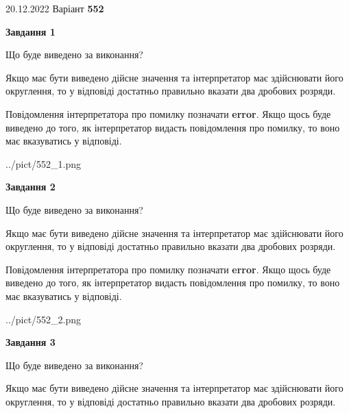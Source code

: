 \documentclass[12pt, ukrainian]{article}
\begin{document}
{20.12.2022 Варіант \No \textbf { 552 }\par}
{
\begin {Large}

{\begin {center}\textbf{Завдання 1}\end {center}}\par
Що буде виведено за виконання? \par

Якщо має бути виведено дійсне значення та інтерпретатор має здійснювати його округлення, 
то у відповіді достатньо правильно вказати два дробових розряди.

Повідомлення інтерпретатора про помилку позначати \textbf{error}.
Якщо щось буде виведено до того, як інтерпретатор видасть повідомлення про помилку, 
то воно має вказуватись у відповіді. \par

\begin{center}
	{../pict/552_1.png}
\end{center}
\newpage

{\begin {center}\textbf{Завдання 2}\end {center}}\par
Що буде виведено за виконання? \par

Якщо має бути виведено дійсне значення та інтерпретатор має здійснювати його округлення, 
то у відповіді достатньо правильно вказати два дробових розряди.

Повідомлення інтерпретатора про помилку позначати \textbf{error}.
Якщо щось буде виведено до того, як інтерпретатор видасть повідомлення про помилку, 
то воно має вказуватись у відповіді. \par

\begin{center}
	{../pict/552_2.png}
\end{center}
\newpage

{\begin {center}\textbf{Завдання 3}\end {center}}\par
Що буде виведено за виконання? \par

Якщо має бути виведено дійсне значення та інтерпретатор має здійснювати його округлення, 
то у відповіді достатньо правильно вказати два дробових розряди.


\end{Large}}
\end{document}
